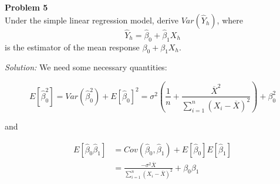 \documentclass{article}
\newenvironment{problem}[2][Problem]
    { \begin{mdframed}[backgroundcolor=gray!20] \textbf{#1 #2} \\}
    {  \end{mdframed}}
\newenvironment{solution}
    {\textit{Solution:}}
    {}
\begin{document}
\begin{problem}{5}
Under the simple linear regression model, derive $Var(\hat Y_h)$, where
$$\hat Y_h = \hat \beta_0 + \hat \beta_1 X_h$$
is the estimator of the mean response $\beta_0 + \beta_1 X_h$.
\end{problem}
\begin{solution}
We need some necessary quantities: 

$$E[\hat \beta_0^2 ] = Var(\hat \beta_0^2) + E[\hat \beta_0]^2 = \sigma^2 
\left ( \frac{1}{n}  + \frac{\overline X^2}{\sum_{i = 1}^n (X_i - \overline X)^2}\right) + \beta_0^2$$

and

\begin{align*}
E[\hat \beta_0 \hat \beta_1] &= Cov(\hat \beta_0, \hat \beta_1) + E[\hat \beta_0] E[\hat \beta_1] \\
&= \frac{- \sigma^2 \overline X}{ \sum_{i = 1}^n (X_i -\overline X)^2} + \beta_0 \beta_1
\end{align*}


\end{solution}
\end{document}
